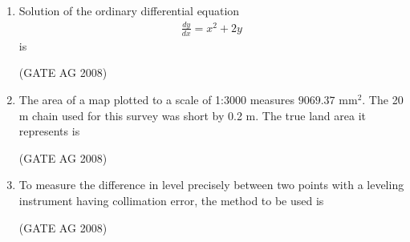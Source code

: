 \documentclass[journal]{IEEEtran}
\begin{document}
\begin{enumerate}
\medskip

\item 
 Solution of the ordinary differential equation 
 \begin{align}
\frac{dy}{dx} = x^2 + 2y  
 \end{align} is
\begin{enumerate}
\end{enumerate}
\hfill(GATE AG 2008)\\

\medskip

\item 
 The area of a map plotted to a scale of 1:3000 measures $9069.37$ mm$^2$. The 20 m chain used for this survey was short by 0.2 m. The true land area it represents is \\
\begin{enumerate}
\end{enumerate}
\hfill(GATE AG 2008)\\

\medskip

\item 
 To measure the difference in level precisely between two points with a leveling instrument having collimation error, the method to be used is 
\begin{enumerate}
\end{enumerate}
\hfill(GATE AG 2008)\\


\end{enumerate}
\end{document}
